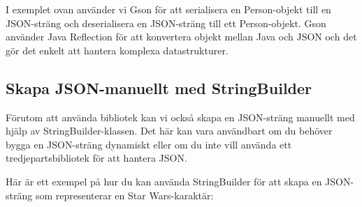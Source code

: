 \begin{Shaded}
\begin{Highlighting}[]
     \OperatorTok{(}\OperatorTok{,} \OperatorTok{)} \OperatorTok{\{}
         \OperatorTok{=}\OperatorTok{;}
         \OperatorTok{=}\OperatorTok{;}
    \OperatorTok{\}}

      \OperatorTok{()} \OperatorTok{\{}
        \OperatorTok{;}
    \OperatorTok{\}}

      \OperatorTok{()} \OperatorTok{\{}
        \OperatorTok{;}
    \OperatorTok{\}}
\OperatorTok{\}}
\end{Highlighting}
\end{Shaded}

I exemplet ovan använder vi Gson för att serialisera en Person-objekt
till en JSON-sträng och deserialisera en JSON-sträng till ett
Person-objekt. Gson använder Java Reflection för att konvertera objekt
mellan Java och JSON och det gör det enkelt att hantera komplexa
datastrukturer.

\hypertarget{skapa-json-manuellt-med-stringbuilder}{%
\subsection{Skapa JSON-manuellt med
StringBuilder}\label{skapa-json-manuellt-med-stringbuilder}}

Förutom att använda bibliotek kan vi också skapa en JSON-sträng manuellt
med hjälp av StringBuilder-klassen. Det här kan vara användbart om du
behöver bygga en JSON-sträng dynamiskt eller om du inte vill använda ett
tredjepartsbibliotek för att hantera JSON.

Här är ett exempel på hur du kan använda StringBuilder för att skapa en
JSON-sträng som representerar en Star Wars-karaktär:

